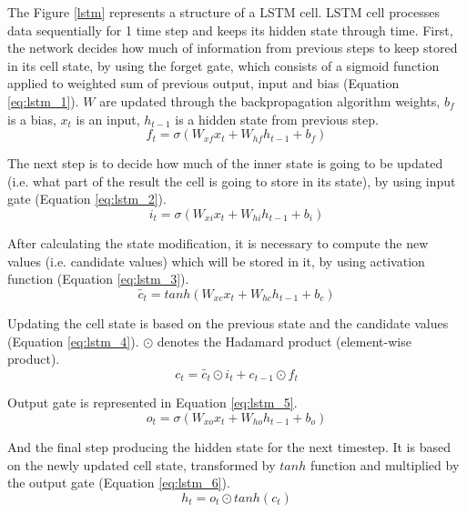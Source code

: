 The Figure \ref{lstm} represents a structure of a LSTM cell. LSTM cell processes data sequentially for 1 time step and keeps its hidden state through time. First, the network decides how much of information from previous steps to keep stored in its cell state, by using the forget gate, which consists of a sigmoid function applied to weighted sum of previous output, input and bias (Equation \ref{eq:lstm_1}). $W$ are updated through the backpropagation algorithm weights, $b_f$ is a bias, $x_t$ is an input, $h_{t-1}$ is a hidden state from previous step.
\begin{equation} \label{eq:lstm_1}
f_t = \sigma(W_{xf}x_t + W_{hf}h_{t-1}+b_f)
\end{equation}

The next step is to decide how much of the inner state is going to be updated (i.e. what part of the result the cell is going to store in its state), by using input gate (Equation \ref{eq:lstm_2}).
\begin{equation} \label{eq:lstm_2}
i_t = \sigma(W_{xi}x_t + W_{hi}h_{t-1}+b_i)
\end{equation}

After calculating the state modification, it is necessary to compute the new values (i.e. candidate values) which will be stored in it, by using activation function (Equation \ref{eq:lstm_3}).
\begin{equation} \label{eq:lstm_3}
\tilde{c_{t}}=tanh(W_{xc}x_t + W_{hc}h_{t-1} + b_c)
\end{equation}

Updating the cell state is based on the previous state and the candidate values (Equation \ref{eq:lstm_4}). $\odot$ denotes the Hadamard product (element-wise product).
\begin{equation} \label{eq:lstm_4}
c_t = \tilde{c_{t}} \odot i_t + c_{t-1} \odot f_t
\end{equation}

Output gate is represented in Equation \ref{eq:lstm_5}.
\begin{equation} \label{eq:lstm_5}
o_t = \sigma(W_{xo}x_t + W_{ho}h_{t-1}+b_o)
\end{equation}

And the final step producing the hidden state for the next timestep. It is based on the newly updated cell state, transformed by $tanh$ function and multiplied by the output gate (Equation \ref{eq:lstm_6}).
\begin{equation} \label{eq:lstm_6}
h_t = o_t \odot tanh(c_t)
\end{equation}

